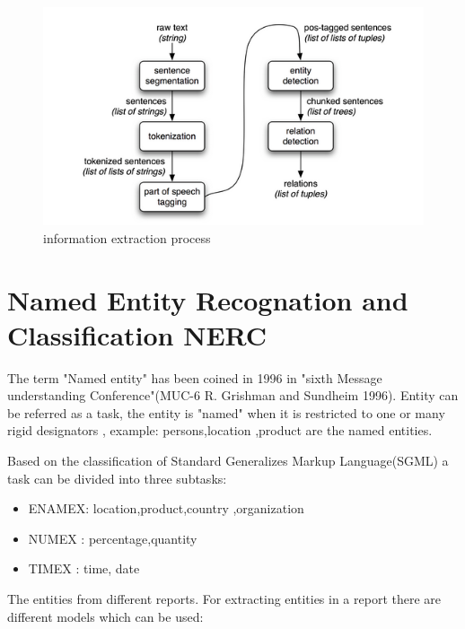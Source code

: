 \begin{itemize}
\begin{figure}[hbtp]
\caption{information extraction process}
\centering
\includegraphics[scale=0.4]{images/nltk.png}
\end{figure}
\end{itemize}

\section{ Named Entity Recognation and Classification  NERC}
The term "Named entity" has been coined in 1996 in "sixth  Message understanding Conference"(MUC-6  R. Grishman and  Sundheim 1996).
Entity can be referred as a task, the entity is "named" when it is restricted to one or many rigid designators \citep{sharnagat2014named}, example: persons,location ,product are the named entities.

Based on the classification of Standard Generalizes Markup Language(SGML) a task can be divided into three subtasks:
\begin{itemize}
\item ENAMEX: location,product,country ,organization
\item NUMEX : percentage,quantity 
\item TIMEX : time, date
\end{itemize}

The entities from different reports.
For extracting entities in a report there are different models which can be used:

